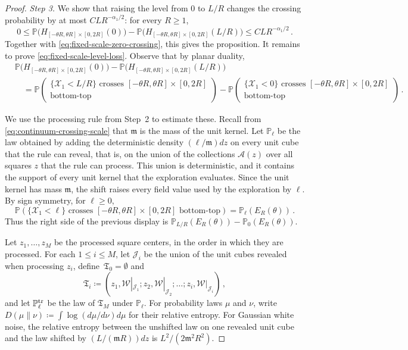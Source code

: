 \documentclass[11pt]{amsart}
\theoremstyle{plain}
\theoremstyle{definition}
\renewcommand{\P}{\mathbb{P}}
\begin{document}
\begin{proof}
\smallskip
\noindent\emph{Step 3.} We show that raising the level from $0$ to $L/R$
changes the crossing probability by at most $C L R^{-\alpha_1/2}$: for every $R\geq 1$,
\begin{equation}\label{eq:fixed-scale-level-loss}
    0\leq
    \P\bigl(H_{[-\theta R,\theta R]\times[0,2R]}(0)\bigr)
    -
    \P\bigl(H_{[-\theta R,\theta R]\times[0,2R]}(L/R)\bigr)
    \leq C L R^{-\alpha_1/2}\, .
\end{equation}
Together with \eqref{eq:fixed-scale-zero-crossing},
this gives the proposition. It remains to prove
\eqref{eq:fixed-scale-level-loss}.
Observe that by planar duality, 
\[
\begin{aligned}
&\P\bigl(H_{[-\theta R,\theta R]\times[0,2R]}(0)\bigr)
-
\P\bigl(H_{[-\theta R,\theta R]\times[0,2R]}(L/R)\bigr)\\
&\quad =
\P\left(
\begin{gathered}
\{\mathcal X_1<L/R\}\text{ crosses }[-\theta R,\theta R]\times[0,2R]\\
\text{bottom-top}
\end{gathered}
\right)
-
\P\left(
\begin{gathered}
\{\mathcal X_1<0\}\text{ crosses }[-\theta R,\theta R]\times[0,2R]\\
\text{bottom-top}
\end{gathered}
\right)\, .
\end{aligned}
\]

We use the processing rule from Step~2 to estimate these. Recall
from \eqref{eq:continuum-crossing-scale} that $\mathfrak m$ is the mass of the unit
kernel. Let $\P_\ell$ be the law obtained by adding the deterministic density
$(\ell/\mathfrak m)dz$ on every unit cube that the rule can reveal, that is, on
the union of the collections $\mathcal A(z)$ over all squares $z$ that the rule
can process. This union is deterministic, and it contains the support of every
unit kernel that the exploration evaluates. Since the unit kernel has mass
$\mathfrak m$, the shift raises every field value used by the exploration
by $\ell$. By sign symmetry, for $\ell\geq0$,
\[
    \P\left(\{\mathcal X_1<\ell\}\text{ crosses }
    [-\theta R,\theta R]\times[0,2R]\text{ bottom-top}\right)
    =
    \P_\ell(E_R(\theta))\, .
\]
Thus the right side of the previous display is
$\P_{L/R}(E_R(\theta))-\P_0(E_R(\theta))$.

Let $z_1,\ldots,z_M$ be the processed square centers, in the order in which
they are processed. For each $1 \leq i \leq M$, let $\mathcal J_i$ be the union of the unit
cubes revealed when processing $z_i$,  define~$\mathfrak T_0 = \emptyset$ and
\[
    \mathfrak T_i \coloneqq 
    \left(
    z_1,\mathcal W|_{\mathcal J_1};
    z_2,\mathcal W|_{\mathcal J_2};
    \ldots;
    z_i,\mathcal W|_{\mathcal J_i}
    \right) \, ,
\]
and let $\P_\ell^{\rm tr}$ be the law of $\mathfrak T_M$ under $\P_\ell$. For probability laws $\mu$ and $\nu$, write
$D(\mu\|\nu)\coloneqq\int\log(d\mu/d\nu)d\mu$ for their relative entropy. For Gaussian white
noise, the relative entropy between the unshifted law on one revealed unit cube and the law shifted by $(L/(\mathfrak m R))dz$ is $L^2/(2\mathfrak m^2R^2)$.


\end{proof}
\end{document}
